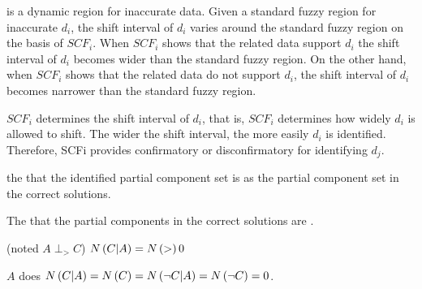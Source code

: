 \begin{defi}
 is a dynamic region for inaccurate data. Given a standard fuzzy region for inaccurate $d_i$, the shift interval of $d_i$ varies around the standard fuzzy region on the basis of $SCF_i$. When $SCF_i$ shows that the related data support $d_i$ the shift interval of $d_i$ becomes wider than the standard fuzzy region. On the other hand, when $SCF_i$ shows that the related data do not support $d_i$, the shift interval of $d_i$ becomes narrower than the standard fuzzy region.
\cite{conf/ijcai/ZhaoN95}
\end{defi}

\begin{defi}
$SCF_i$ determines the shift interval of $d_i$, that is, $SCF_i$ determines how widely $d_i$ is allowed to shift. The wider the shift interval, the more easily $d_i$ is identified. Therefore, SCFi provides confirmatory or disconfirmatory  for identifying $d_j$.
\cite{conf/ijcai/ZhaoN95}
\end{defi}

\begin{defi}
the  that the identified partial component set is  as the partial component set in the correct solutions.
\cite{conf/ijcai/ZhaoN95}
\end{defi}

\begin{defi}
The  that the partial components in the correct solutions are .
\cite{conf/ijcai/ZhaoN95}
\end{defi}

\begin{defi}
 (noted $A\perp_{>} C$) \iffTx{} $N\left(C|A\right)=N\left(>\right)0$
\cite{conf/ijcai/DuboisCHP97}
\end{defi}

\begin{defi}
$A$ does  \iffTx{} $N\left(C|A\right)=N\left(C\right)=N\left(\neg C|A\right)=N\left(\neg C\right)=0$.
\cite{conf/ijcai/DuboisCHP97}
\end{defi}

